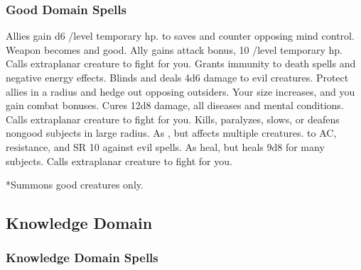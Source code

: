 \subsubsection{Good Domain Spells}
\begin{spelllist}
 Allies gain d6 /level temporary hp.
  to saves and counter opposing mind control.
 Weapon becomes  and good.
\spellhead[2]{}
 Ally gains  attack bonus, 10 /level temporary hp.
 Calls extraplanar creature to fight for you.
 Grants immunity to death spells and negative energy effects.
 Blinds and deals 4d6 damage to evil creatures.
 Protect allies in a \areamed radius and hedge out opposing outsiders.
 Your size increases, and you gain combat bonuses.
 Cures 12d8 damage, all diseases and mental conditions.
 Calls extraplanar creature to fight for you.
\F Kills, paralyzes, slows, or deafens nongood subjects in large radius.
\spellhead[7]{}
 As , but affects multiple creatures.
  to AC,  resistance, and SR 10 against evil spells.
 As heal, but heals 9d8 for many subjects.
 Calls extraplanar creature to fight for you.
\end{spelllist}
*Summons good creatures only.

\subsection{Knowledge Domain}
\subsubsection{Knowledge Domain Spells}
\begin{spelllist}
\spellhead[1]{}
\spellhead[2]{}
\spellhead[8]{}
\end{spelllist}

